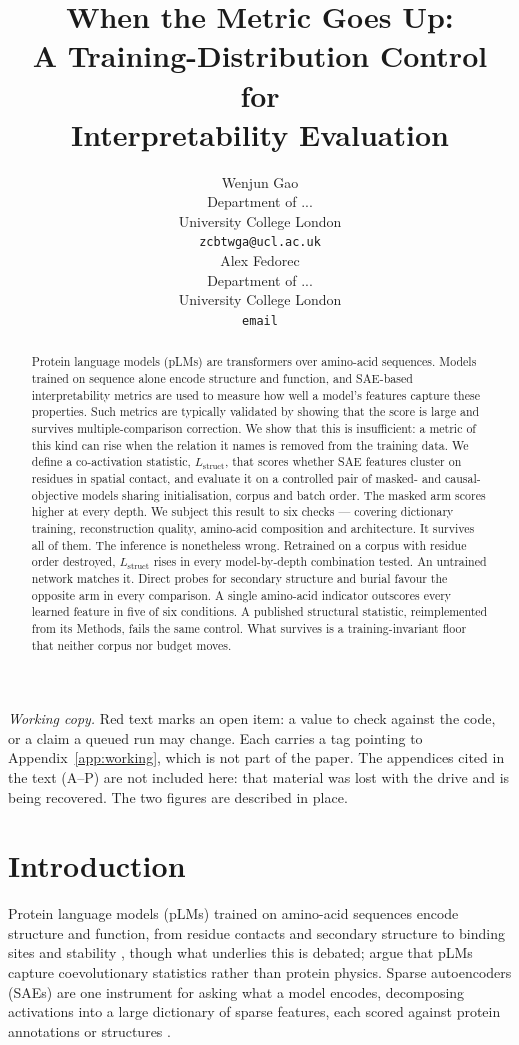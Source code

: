 \documentclass{article} %
\title{When the Metric Goes Up:\\ A Training-Distribution Control for\\ Interpretability Evaluation}
\author{Wenjun Gao \\
Department of ... \\
University College London \\
\texttt{zcbtwga@ucl.ac.uk} \\
\And
Alex Fedorec \\
Department of ... \\
University College London \\
\texttt{email}
}
\newcommand{\red}[1]{\textcolor{red}{#1}}
\renewcommand{\red}[1]{#1}
\newcommand{\Lstruct}{\ensuremath{L_{\mathrm{struct}}}}
\begin{document}
\maketitle

\begin{abstract}
Protein language models (pLMs) are transformers over amino-acid sequences. Models trained on
sequence alone encode structure and function, and SAE-based interpretability metrics are used
to measure how well a model's features capture these properties. Such metrics are typically
validated by showing that the score is large and survives multiple-comparison correction. We
show that this is insufficient: a metric of this kind can rise when the relation it names is
removed from the training data. We define a co-activation statistic, \Lstruct, that scores
whether SAE features cluster on residues in spatial contact, and evaluate it on a controlled
pair of masked- and causal-objective models sharing initialisation, corpus and batch order.
The masked arm scores higher at every depth. We subject this result to six checks --- covering
dictionary training, reconstruction quality, amino-acid composition and architecture. It
survives all of them. The inference is nonetheless wrong. Retrained on a corpus with residue
order destroyed, \Lstruct{} rises in every model-by-depth combination tested. An untrained
network matches it. Direct probes for secondary structure and burial favour the opposite arm
in every comparison. A single amino-acid indicator outscores every learned feature in five of
six conditions. A published structural statistic, reimplemented from its Methods, fails the
same control. What survives is a training-invariant floor that neither corpus nor budget
moves.
\end{abstract}

\ifdefined\CLEANCOPY\else
\red{\emph{Working copy.} Red text marks an open item: a value to check against the code, or a
claim a queued run may change. Each carries a tag pointing to Appendix~\ref{app:working}, which
is not part of the paper. The appendices cited in the text (A--P) are not included here: that
material was lost with the drive and is being recovered. The two figures are described in place.}
\fi

\section{Introduction}

Protein language models (pLMs) trained on amino-acid sequences encode structure and function,
from residue contacts and secondary structure to binding sites and stability
\citep{rives2021biological,rao2021transformer}, though what underlies this is debated;
\citet{zhang2024protein} argue that pLMs capture coevolutionary statistics rather than protein
physics. Sparse autoencoders (SAEs) are one instrument for asking what a model encodes,
decomposing activations into a large dictionary of sparse features, each scored against protein
annotations or structures \citep{simon2025interplm,adams2025mechanistic,gujral2025sparse}.
\end{document}
